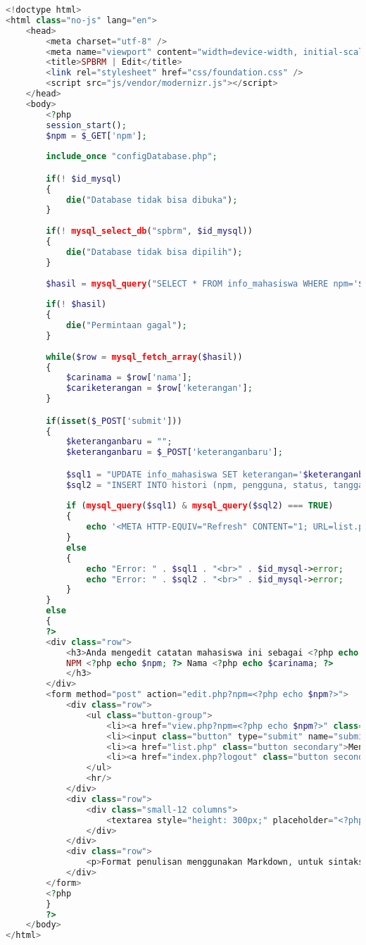 \begin{lstlisting}[language=php,basicstyle=\tiny,caption=edit.php]
<!doctype html>
<html class="no-js" lang="en">
	<head>
		<meta charset="utf-8" />
		<meta name="viewport" content="width=device-width, initial-scale=1.0" />
		<title>SPBRM | Edit</title>
		<link rel="stylesheet" href="css/foundation.css" />
		<script src="js/vendor/modernizr.js"></script>
	</head>
	<body>
		<?php
		session_start();
		$npm = $_GET['npm'];
		
		include_once "configDatabase.php";

		if(! $id_mysql)
		{
			die("Database tidak bisa dibuka");
		}
			
		if(! mysql_select_db("spbrm", $id_mysql))
		{
			die("Database tidak bisa dipilih");
		}
			
		$hasil = mysql_query("SELECT * FROM info_mahasiswa WHERE npm='$npm'", $id_mysql);
		
		if(! $hasil)
		{
			die("Permintaan gagal");
		}
		
		while($row = mysql_fetch_array($hasil))
		{
			$carinama = $row['nama'];
			$cariketerangan = $row['keterangan'];
		}

		if(isset($_POST['submit']))
		{
			$keteranganbaru = "";
			$keteranganbaru = $_POST['keteranganbaru'];

			$sql1 = "UPDATE info_mahasiswa SET keterangan='$keteranganbaru', pembaruan_terakhir=now() WHERE npm='$npm'";
			$sql2 = "INSERT INTO histori (npm, pengguna, status, tanggal_pembaruan, keterangan) VALUES ('". mysql_real_escape_string($npm)  ."', '".$_SESSION['email']."', 'mengedit', now(), '". mysql_real_escape_string($keteranganbaru)  ."')";
			
			if (mysql_query($sql1) & mysql_query($sql2) === TRUE) 
			{
				echo '<META HTTP-EQUIV="Refresh" CONTENT="1; URL=list.php">';
			} 
			else
			{
				echo "Error: " . $sql1 . "<br>" . $id_mysql->error;
				echo "Error: " . $sql2 . "<br>" . $id_mysql->error;
			}
		}
		else
		{
		?>
		<div class="row">
			<h3>Anda mengedit catatan mahasiswa ini sebagai <?php echo $_SESSION['email']?>.<br/>
			NPM <?php echo $npm; ?> Nama <?php echo $carinama; ?>
			</h3>
		</div>
		<form method="post" action="edit.php?npm=<?php echo $npm?>">
			<div class="row">
				<ul class="button-group">
					<li><a href="view.php?npm=<?php echo $npm?>" class="button secondary">Kembali</a></li>
					<li><input class="button" type="submit" name="submit" value="Simpan"></li>
					<li><a href="list.php" class="button secondary">Menu Utama</a></li>
					<li><a href="index.php?logout" class="button secondary">Logout</a></li>
				</ul>
				<hr/>
			</div>
			<div class="row">
				<div class="small-12 columns">
					<textarea style="height: 300px;" placeholder="<?php echo $cariketerangan; ?>" name="keteranganbaru"><?php echo $cariketerangan; ?></textarea>
				</div>
			</div>
			<div class="row">
				<p>Format penulisan menggunakan Markdown, untuk sintaks Markdown dapat dilihat <a href='https://help.github.com/articles/github-flavored-markdown/' target="_blank">disini</a>.</p>
			</div>
		</form>
		<?php
		}
		?>
	</body>
</html>
\end{lstlisting}


